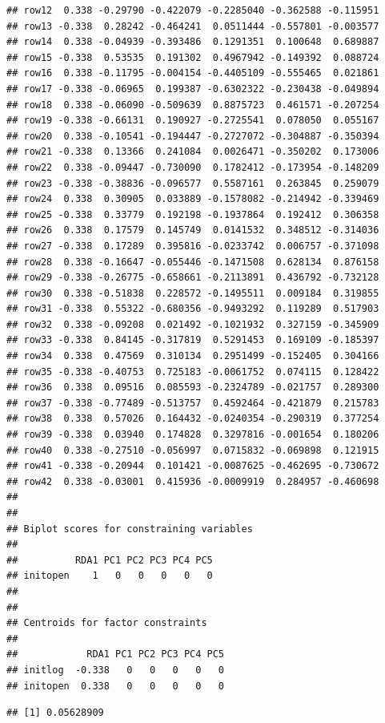 \documentclass[
]{article}
\begin{document}
\begin{verbatim}
## row12  0.338 -0.29790 -0.422079 -0.2285040 -0.362588 -0.115951
## row13 -0.338  0.28242 -0.464241  0.0511444 -0.557801 -0.003577
## row14  0.338 -0.04939 -0.393486  0.1291351  0.100648  0.689887
## row15 -0.338  0.53535  0.191302  0.4967942 -0.149392  0.088724
## row16  0.338 -0.11795 -0.004154 -0.4405109 -0.555465  0.021861
## row17 -0.338 -0.06965  0.199387 -0.6302322 -0.230438 -0.049894
## row18  0.338 -0.06090 -0.509639  0.8875723  0.461571 -0.207254
## row19 -0.338 -0.66131  0.190927 -0.2725541  0.078050  0.055167
## row20  0.338 -0.10541 -0.194447 -0.2727072 -0.304887 -0.350394
## row21 -0.338  0.13366  0.241084  0.0026471 -0.350202  0.173006
## row22  0.338 -0.09447 -0.730090  0.1782412 -0.173954 -0.148209
## row23 -0.338 -0.38836 -0.096577  0.5587161  0.263845  0.259079
## row24  0.338  0.30905  0.033889 -0.1578082 -0.214942 -0.339469
## row25 -0.338  0.33779  0.192198 -0.1937864  0.192412  0.306358
## row26  0.338  0.17579  0.145749  0.0141532  0.348512 -0.314036
## row27 -0.338  0.17289  0.395816 -0.0233742  0.006757 -0.371098
## row28  0.338 -0.16647 -0.055446 -0.1471508  0.628134  0.876158
## row29 -0.338 -0.26775 -0.658661 -0.2113891  0.436792 -0.732128
## row30  0.338 -0.51838  0.228572 -0.1495511  0.009184  0.319855
## row31 -0.338  0.55322 -0.680356 -0.9493292  0.119289  0.517903
## row32  0.338 -0.09208  0.021492 -0.1021932  0.327159 -0.345909
## row33 -0.338  0.84145 -0.317819  0.5291453  0.169109 -0.185397
## row34  0.338  0.47569  0.310134  0.2951499 -0.152405  0.304166
## row35 -0.338 -0.40753  0.725183 -0.0061752  0.074115  0.128422
## row36  0.338  0.09516  0.085593 -0.2324789 -0.021757  0.289300
## row37 -0.338 -0.77489 -0.513757  0.4592464 -0.421879  0.215783
## row38  0.338  0.57026  0.164432 -0.0240354 -0.290319  0.377254
## row39 -0.338  0.03940  0.174828  0.3297816 -0.001654  0.180206
## row40  0.338 -0.27510 -0.056997  0.0715832 -0.069898  0.121915
## row41 -0.338 -0.20944  0.101421 -0.0087625 -0.462695 -0.730672
## row42  0.338 -0.03001  0.415936 -0.0009919  0.284957 -0.460698
## 
## 
## Biplot scores for constraining variables
## 
##          RDA1 PC1 PC2 PC3 PC4 PC5
## initopen    1   0   0   0   0   0
## 
## 
## Centroids for factor constraints
## 
##            RDA1 PC1 PC2 PC3 PC4 PC5
## initlog  -0.338   0   0   0   0   0
## initopen  0.338   0   0   0   0   0
\end{verbatim}

\begin{verbatim}
## [1] 0.05628909
\end{verbatim}
\end{document}

